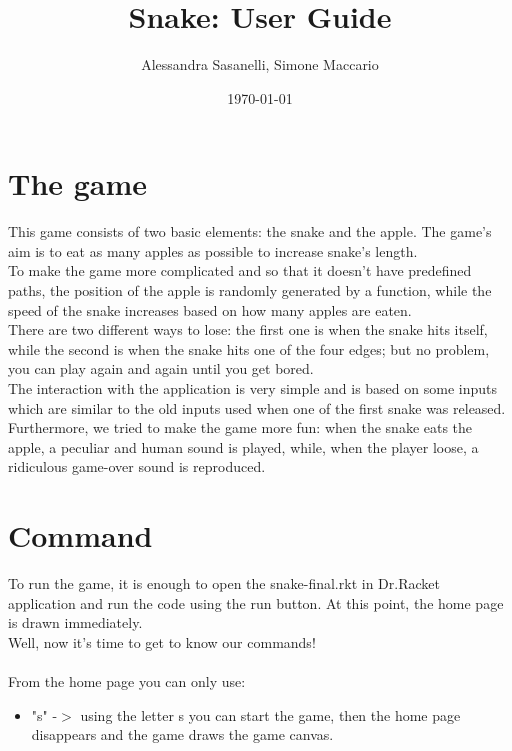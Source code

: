 \documentclass{article}
\title{Snake: User Guide}
\author{Alessandra Sasanelli, Simone Maccario}
\date{\today}
\begin{document}
	\maketitle
	
	\section{The game}
	This game consists of two basic elements: the snake and the apple. The game's aim is to eat as many apples as possible to increase snake's length.\\
	To make the game more complicated and so that it doesn't have predefined paths, the position of the apple is randomly generated by a function, while the speed of the snake increases based on how many apples are eaten.\\
	There are two different ways to lose: the first one is when the snake hits itself, while the second is when the snake hits one of the four edges; but no problem, you can play again and again until you get bored.\\
	The interaction with the application is very simple and is based on some inputs which are similar to the old inputs used when one of the first snake was released.
	Furthermore, we tried to make the game more fun: when the snake eats the apple, a peculiar and human sound is played, while, when the player loose, a ridiculous game-over sound is reproduced.
	
	\section{Command}	
	To run the game, it is enough to open the snake-final.rkt in Dr.Racket application and run the code using the run button. At this point, the home page is drawn immediately.
	\\Well, now it's time to get to know our commands!\\\\
	\noindent From the home page you can only use:
	\begin{itemize}
		\item "s" -$>$ using the letter s you can start the game, then the home page disappears and the game draws the game canvas.
	\end{itemize} 
\end{document}
